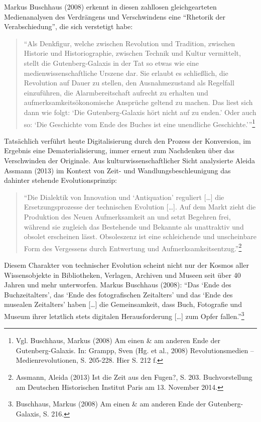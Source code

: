 \documentclass[a4paper,
fontsize=11pt,
oneside,
numbers=noperiodatend,
parskip=half-,
bibliography=totoc,
final
]{scrartcl}
\begin{document}
Markus Buschhaus (2008) erkennt in diesen zahllosen gleichgearteten
Medienanalysen des Verdrängens und Verschwindens eine \enquote{Rhetorik
der Verabschiedung}, die sich verstetigt habe:

\begin{quote}
\enquote{Als Denkfigur, welche zwischen Revolution und Tradition,
zwischen Historie und Historiographie, zwischen Technik und Kultur
vermittelt, stellt die Gutenberg-Galaxis in der Tat so etwas wie eine
medienwissenschaftliche Urszene dar. Sie erlaubt es schließlich, die
Revolution auf Dauer zu stellen, den Ausnahmezustand als Regelfall
einzuführen, die Alarmbereitschaft aufrecht zu erhalten und
aufmerksamkeitsökonomische Ansprüche geltend zu machen. Das liest sich
dann wie folgt: \enquote{Die Gutenberg-Galaxis hört nicht auf zu enden.}
Oder auch so: \enquote{Die Geschichte vom Ende des Buches ist eine
unendliche Geschichte.}}\footnote{Vgl. Buschhaus, Markus (2008) Am einen
  \& am anderen Ende der Gutenberg-Galaxis. In: Grampp, Sven (Hg. et
  al., 2008) Revolutionsmedien -- Medienrevolutionen, S. 205-228. Hier
  S. 212 f.}
\end{quote}

Tatsächlich verführt heute Digitalisierung durch den Prozess der
Konversion, im Ergebnis eine Dematerialisierung, immer erneut zum
Nachdenken über das Verschwinden der Originale. Aus
kulturwissenschaftlicher Sicht analysierte Aleida Assmann (2013) im
Kontext von Zeit- und Wandlungsbeschleunigung das dahinter stehende
Evolutionsprinzip:

\begin{quote}
\enquote{Die Dialektik von Innovation und \enquote{Antiquation}
reguliert {[}\ldots{}{]} die Ersetzungsprozesse der technischen
Evolution {[}\ldots{}{]}. Auf dem Markt zieht die Produktion des Neuen
Aufmerksamkeit an und setzt Begehren frei, während sie zugleich das
Bestehende und Bekannte als unattraktiv und obsolet erscheinen lässt.
Obsoleszenz ist eine schleichende und unscheinbare Form des Vergessens
durch Entwertung und Aufmerksamkeitsentzug.}\footnote{Assmann, Aleida
  (2013) Ist die Zeit aus den Fugen?, S. 203. Buchvorstellung am
  Deutschen Historischen Institut Paris am 13. November 2014.}
\end{quote}

Diesem Charakter von technischer Evolution scheint nicht nur der Kosmos
aller Wissensobjekte in Bibliotheken, Verlagen, Archiven und Museen seit
über 40 Jahren und mehr unterworfen. Markus Buschhaus (2008):
\enquote{Das \enquote{Ende des Buchzeitalters}, das \enquote{Ende des
fotografischen Zeitalters} und das \enquote{Ende des musealen
Zeitalters} haben {[}\ldots{}{]} die Gemeinsamkeit, dass Buch,
Fotografie und Museum ihrer letztlich stets digitalen Herausforderung
{[}\ldots{}{]} zum Opfer fallen.}\footnote{Buschhaus, Markus (2008) Am
  einen \& am anderen Ende der Gutenberg-Galaxis, S. 216.}
\end{document}

